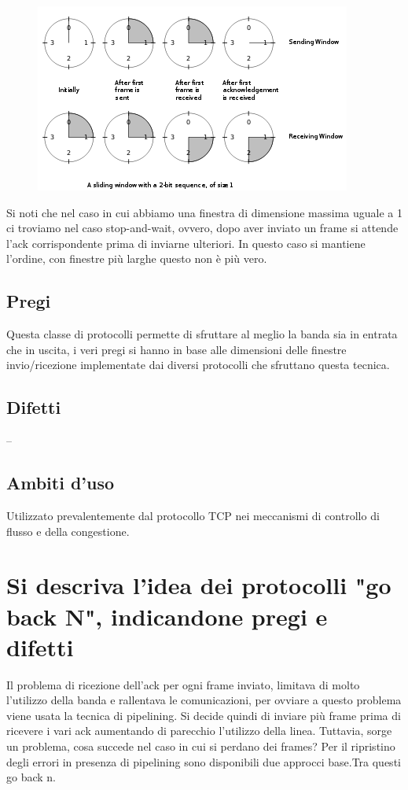 \begin{figure}[H]
\centering
\includegraphics[scale=1]{res/img/19_SlidingWindow.png}
\end{figure}
 
Si noti che nel caso in cui abbiamo una finestra di dimensione massima uguale a 1 ci troviamo nel caso stop-and-wait, ovvero, dopo aver inviato un frame si attende l'ack corrispondente prima di inviarne ulteriori. In questo caso si mantiene l'ordine, con finestre più larghe questo non è più vero.

\subsection{Pregi}
Questa classe di protocolli permette di sfruttare al meglio la banda sia in entrata che in uscita, i veri pregi si hanno in base alle dimensioni delle finestre invio/ricezione implementate dai diversi protocolli che sfruttano questa tecnica.

\subsection{Difetti}
--

\subsection{Ambiti d'uso}
Utilizzato prevalentemente dal protocollo TCP nei meccanismi di controllo di flusso e della congestione.

\section{Si descriva l'idea dei protocolli "go back N", indicandone pregi e difetti}

Il problema di ricezione dell'ack per ogni frame inviato, limitava di molto l'utilizzo della banda e rallentava le comunicazioni, per ovviare a questo problema viene usata la tecnica di pipelining. Si decide quindi di inviare più frame prima di ricevere i vari ack aumentando di parecchio l'utilizzo della linea. Tuttavia, sorge un problema, cosa succede nel caso in cui si perdano dei frames? Per il ripristino degli errori in presenza di pipelining sono disponibili due approcci base.Tra questi go back n.
